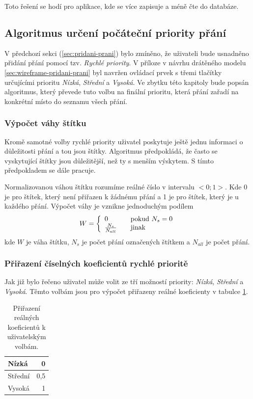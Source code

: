 Toto řešení se hodí pro aplikace, kde se více zapisuje a méně čte do databáze.

\subsection{Algoritmus určení počáteční priority přání}
V předchozí sekci (\ref{sec:pridani-prani}) bylo zmíněno, že uživateli bude usnadněno přidání přání pomocí tzv. \emph{Rychlé priority}. V příloze v návrhu drátěného modelu \ref{sec:wireframe-pridani-prani} byl navržen ovládací prvek s třemi tlačítky určujícími prioritu \emph{Nízká}, \emph{Střední} a \emph{Vysoká}. Ve zbytku této kapitoly bude popsán algoritmus, který převede tuto volbu na finální prioritu, která přání zařadí na konkrétní místo do seznamu všech přání.

\subsubsection{Výpočet váhy štítku}
Kromě samotné volby rychlé priority uživatel poskytuje ještě jednu informaci o důležitosti přání a tou jsou štítky. Algoritmus předpokládá, že často se vyskytující štítky jsou důležitější, než ty s menším výskytem. S tímto předpokladem se dále pracuje.

Normalizovanou váhou štítku rozumíme reálné číslo v intervalu $<0;1>$. Kde 0 je pro štítek, který není přiřazen k žádnému přání a 1 je pro štítek, který je u každého přání. Výpočet váhy je vznikne jednoduchým podílem
\begin{equation}
W = \left\{
  \begin{array}{l l}
    0 & \quad \text{pokud }N_s = 0\\
    \frac{N_s}{N_{all}} & \quad \text{jinak}
  \end{array} \right.
\label{eq:vaha-stitku}
\end{equation}
kde $W$ je váha štítku, $N_s$ je počet přání označených štítkem a $N_{all}$ je počet přání.

\subsubsection{Přiřazení číselných koeficientů rychlé prioritě}
Jak již bylo řečeno uživatel může volit ze tří možností priority: \emph{Nízká}, \emph{Střední} a \emph{Vysoká}. Těmto volbám jsou pro výpočet přiřazeny reálné koeficienty v tabulce \ref{tab:rychla-priorita}.

\begin{table}[htb]
\begin{center}
\begin{tabular}{|l|r|}
\hline
Nízká & 0\\ \hline
Střední & 0,5\\ \hline
Vysoká & 1 \\
\hline
\end{tabular}
\caption{Přiřazení reálných koeficientů k uživatelským volbám.}
\label{tab:rychla-priorita}
\end{center}
\end{table}

